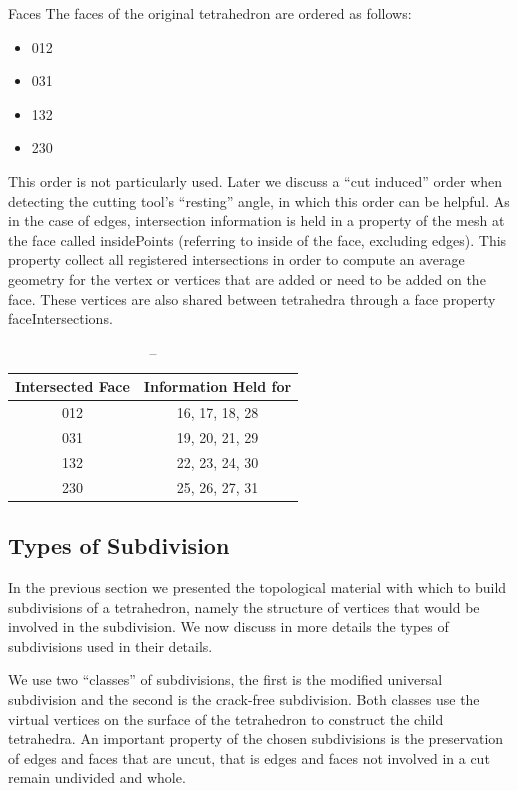 Faces
The faces of the original tetrahedron are ordered as follows:

\begin{itemize}
    \item 012
    \item 031
    \item 132
    \item 230
\end{itemize}


This order is not particularly used. Later we discuss a \enquote{cut induced} order when detecting the cutting tool's \enquote{resting} angle, in which this order can be helpful.
As in the case of edges, intersection information is held in a property of the mesh at the face called insidePoints (referring to inside of the face, excluding edges). This property collect all registered intersections in order to compute an average geometry for the vertex or vertices that are added or need to be added on the face. These vertices are also shared between tetrahedra through a face property faceIntersections.

\begin{table}[]
\begin{tabular}{|c|c|}
\hline
Intersected Face & Information Held for \\ \hline
012              & 16, 17, 18, 28       \\ \hline
031              & 19, 20, 21, 29       \\ \hline
132              & 22, 23, 24, 30       \\ \hline
230              & 25, 26, 27, 31       \\ \hline
\end{tabular}
\caption{--}
\end{table}


\subsection{Types of Subdivision}
In the previous section we presented the topological material with which to build subdivisions of a tetrahedron, namely the structure of vertices that would be involved in the subdivision. We now discuss in more details the types of subdivisions used in their details.

We use two \enquote{classes} of subdivisions, the first is the modified universal subdivision and the second is the crack-free subdivision. Both classes use the virtual vertices on the surface of the tetrahedron to construct the child tetrahedra. An important property of the chosen subdivisions is the preservation of edges and faces that are uncut, that is edges and faces not involved in a cut remain undivided and whole.

